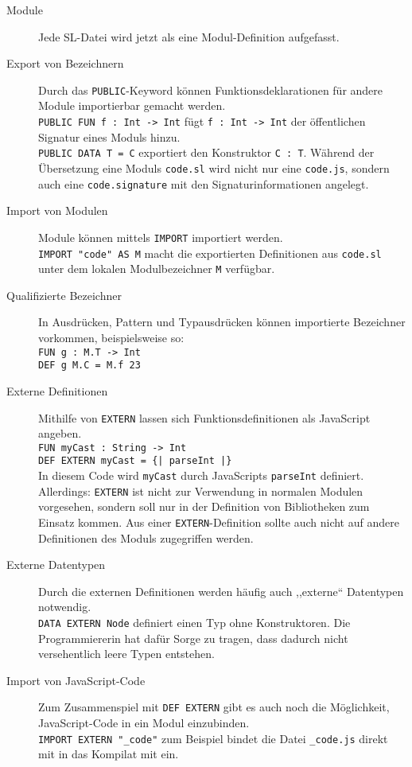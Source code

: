 \documentclass[runningheads]{llncs}
\begin{document}
\begin{description}
 \item[Module] Jede SL-Datei wird jetzt als eine Modul-Definition aufgefasst.
 \item[Export von Bezeichnern] Durch das \verb|PUBLIC|-Keyword können
   Funktionsdeklarationen für andere Module importierbar gemacht werden. \\
   \verb|PUBLIC FUN f : Int -> Int| \quad fügt \verb|f : Int -> Int|
   der öffentlichen Signatur eines Moduls hinzu.\\
   \verb|PUBLIC DATA T = C| \quad exportiert den Konstruktor \verb|C : T|.
   Während der Übersetzung eine Moduls \verb|code.sl| wird nicht nur eine
   \verb|code.js|, sondern auch eine \verb|code.signature| mit den
   Signaturinformationen angelegt. 
 \item[Import von Modulen] Module können mittels \verb|IMPORT| importiert 
   werden. \\
   \verb|IMPORT "code" AS M| \quad macht die exportierten Definitionen aus
   \verb|code.sl| unter dem lokalen Modulbezeichner \verb|M| verfügbar. 
 \item[Qualifizierte Bezeichner] In Ausdrücken, Pattern und Typausdrücken
   können importierte Bezeichner vorkommen, beispielsweise so:\\
   \verb|FUN g : M.T -> Int|\\
   \verb|DEF g M.C = M.f 23|
 \item[Externe Definitionen] Mithilfe von \verb|EXTERN| lassen sich
   Funktionsdefinitionen als JavaScript angeben.\\
   \verb|FUN myCast : String -> Int|\\
   \verb.DEF EXTERN myCast = {| parseInt |}.\\
   In diesem Code wird \verb|myCast| durch JavaScripts \verb|parseInt|
   definiert. Allerdings: \verb|EXTERN| ist nicht zur Verwendung in normalen
   Modulen vorgesehen, sondern soll nur in der Definition von Bibliotheken
   zum Einsatz kommen. Aus einer \verb|EXTERN|-Definition sollte auch nicht
   auf andere Definitionen des Moduls zugegriffen werden.
 \item[Externe Datentypen] Durch die externen Definitionen werden häufig
   auch ,,externe`` Datentypen notwendig.\\
   \verb|DATA EXTERN Node| \quad definiert einen Typ ohne Konstruktoren.
   Die Programmiererin hat dafür Sorge zu tragen, dass dadurch nicht
   versehentlich leere Typen entstehen.
 \item[Import von JavaScript-Code] Zum Zusammenspiel mit \verb|DEF EXTERN|
   gibt es auch noch die Möglichkeit, JavaScript-Code in ein Modul
   einzubinden.\\
   \verb|IMPORT EXTERN "_code"| \quad zum Beispiel bindet die Datei
   \verb|_code.js| direkt mit in das Kompilat mit ein.
\end{description}
\end{document}
